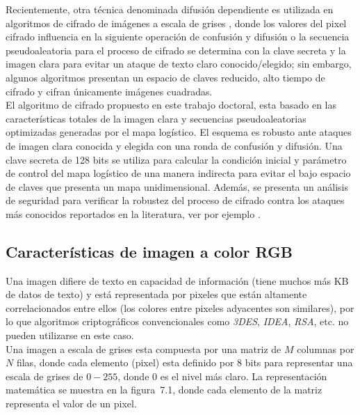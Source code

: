 Recientemente, otra técnica denominada difusión dependiente es utilizada en algoritmos de cifrado de imágenes a escala de grises \cite{ByE_2013, FEtAl_2013a, Z_2012, WyY_2009, ZEtAl_2013}, donde los valores del pixel cifrado influencia en la siguiente operación de confusión y difusión o la secuencia pseudoaleatoria para el proceso de cifrado se determina con la clave secreta y la imagen clara para evitar un ataque de texto claro conocido/elegido; sin embargo, algunos algoritmos presentan un espacio de claves reducido, alto tiempo de cifrado y cifran únicamente imágenes cuadradas. \\
  
El algoritmo de cifrado propuesto en este trabajo doctoral, esta basado en las características totales de la imagen clara y secuencias pseudoaleatorias optimizadas generadas por el mapa logístico. El esquema es robusto ante ataques de imagen clara conocida y elegida con una ronda de confusión y difusión. Una clave secreta de 128 bits se utiliza para calcular la condición inicial y parámetro de control del mapa logístico de una manera indirecta para evitar el bajo espacio de claves que presenta un mapa unidimensional. Además, se presenta un análisis de seguridad para verificar la robustez del proceso de cifrado contra los ataques más conocidos reportados en la literatura, ver por ejemplo \cite{WEtAl_2005, WEtAl_2007, ByN_2008, CyS_2009, AyL_2009, LEtAl_2009, REtAl_2010, SEtAl_2010, LEtAl_2011, ZEtAl_2011, LEtAl_2012}.
 
\subsection{Características de imagen a color RGB}
Una imagen difiere de texto en capacidad de información (tiene muchos más KB de datos de texto) y está representada por pixeles que están altamente correlacionados entre ellos (los colores entre pixeles adyacentes son similares), por lo que algoritmos criptográficos convencionales como \textit{3DES}, \textit{IDEA}, \textit{RSA}, etc. no pueden utilizarse en este caso. \\

Una imagen a escala de grises esta compuesta por una matriz de $M$ columnas por $N$ filas, donde cada elemento (pixel) esta definido por 8 bits para representar una escala de grises de $0-255$, donde 0 es el nivel más claro. La representación matemática se muestra en la figura~7.1, donde cada elemento de la matriz representa el valor de un pixel. \\

